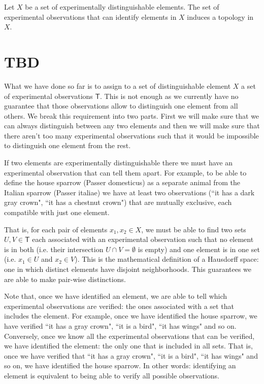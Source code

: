 \documentclass[11pt,letterpaper,fleqn]{memoir} %
\begin{document}
\begin{prop}
	Let $X$ be a set of experimentally distinguishable elements. The set of experimental observations that can identify elements in $X$ induces a topology in $X$.
\end{prop}

\section{TBD}

What we have done so far is to assign to a set of distinguishable element $X$ a set of experimental observations $\mathsf{T}$. This is not enough as we currently have no guarantee that those observations allow to distinguish one element from all others. We break this requirement into two parts. First we will make sure that we can always distinguish between any two elements and then we will make sure that there aren't too many experimental observations such that it would be impossible to distinguish one element from the rest.

If two elements are experimentally distinguishable there we must have an experimental observation that can tell them apart. For example, to be able to define the house sparrow (Passer domesticus) as a separate animal from the Italian sparrow (Passer italiae) we have at least two observations (``it has a dark gray crown", ``it has a chestnut crown") that are mutually exclusive, each compatible with just one element.

That is, for each pair of elements $x_1, x_2 \in X$, we must be able to find two sets $U,V \in \mathsf{T}$ each associated with an experimental observation such that no element is in both (i.e. their intersection $U \cap V=\emptyset$ is empty) and one element is in one set (i.e. $x_1 \in U$ and $x_2 \in V$). This is the mathematical definition of a Hausdorff space: one in which distinct elements have disjoint neighborhoods. This guarantees we are able to make pair-wise distinctions.

Note that, once we have identified an element, we are able to tell which experimental observations are verified: the ones associated with a set that includes the element. For example, once we have identified the house sparrow, we have verified ``it has a gray crown", ``it is a bird", ``it has wings" and so on. Conversely, once we know all the experimental observations that can be verified, we have identified the element: the only one that is included in all sets. That is, once we have verified that ``it has a gray crown", ``it is a bird", ``it has wings" and so on, we have identified the house sparrow. In other words: identifying an element is equivalent to being able to verify all possible observations.
\end{document}
